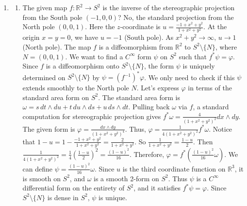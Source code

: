 \documentclass{article}
\begin{document}
\begin{enumerate}[label=\fbox{\arabic*}]
  \item %
        \begin{enumerate}[label=(\arabic*)]
          \item The given map $f: \mathbb{R}^2 \to S^2$ is the inverse of the stereographic projection from the South pole $(-1, 0, 0)$? No, the standard projection from the North pole $(0, 0, 1)$. Here the $z$-coordinate is $u = \frac{-1+x^2+y^2}{1+x^2+y^2}$. At the origin $x=y=0$, we have $u = -1$ (South pole). As $x^2+y^2 \to \infty$, $u \to 1$ (North pole). The map $f$ is a diffeomorphism from $\mathbb{R}^2$ to $S^2 \setminus \{N\}$, where $N = (0, 0, 1)$.
          We want to find a $C^\infty$ form $\psi$ on $S^2$ such that $f^* \psi = \varphi$. Since $f$ is a diffeomorphism onto $S^2 \setminus \{N\}$, the form $\psi$ is uniquely determined on $S^2 \setminus \{N\}$ by $\psi = (f^{-1})^* \varphi$. We only need to check if this $\psi$ extends smoothly to the North pole $N$.
          Let's express $\varphi$ in terms of the standard area form on $S^2$. The standard area form is $\omega = s \, dt \wedge du + t \, du \wedge ds + u \, ds \wedge dt$. 
          Pulling back $\omega$ via $f$, a standard computation for stereographic projection gives $f^* \omega = \frac{4}{(1+x^2+y^2)^2} dx \wedge dy$. 
          The given form is $\varphi = \frac{dx \wedge dy}{(1+x^2+y^2)^4}$. Thus, $\varphi = \frac{1}{4(1+x^2+y^2)^2} f^* \omega$.
          Notice that $1 - u = 1 - \frac{-1+x^2+y^2}{1+x^2+y^2} = \frac{2}{1+x^2+y^2}$. 
          So $\frac{1}{1+x^2+y^2} = \frac{1-u}{2}$. 
          Then $\frac{1}{4(1+x^2+y^2)^2} = \frac{1}{4} \left( \frac{1-u}{2} \right)^2 = \frac{(1-u)^2}{16}$.
          Therefore, $\varphi = f^* \left( \frac{(1-u)^2}{16} \omega \right)$. 
          We can define $\psi = \frac{(1-u)^2}{16} \omega$. Since $u$ is the third coordinate function on $\mathbb{R}^3$, it is smooth on $S^2$, and $\omega$ is a smooth 2-form on $S^2$. Thus $\psi$ is a $C^\infty$ differential form on the entirety of $S^2$, and it satisfies $f^* \psi = \varphi$. Since $S^2 \setminus \{N\}$ is dense in $S^2$, $\psi$ is unique.
          

\end{enumerate}
\end{enumerate}
\end{document}
